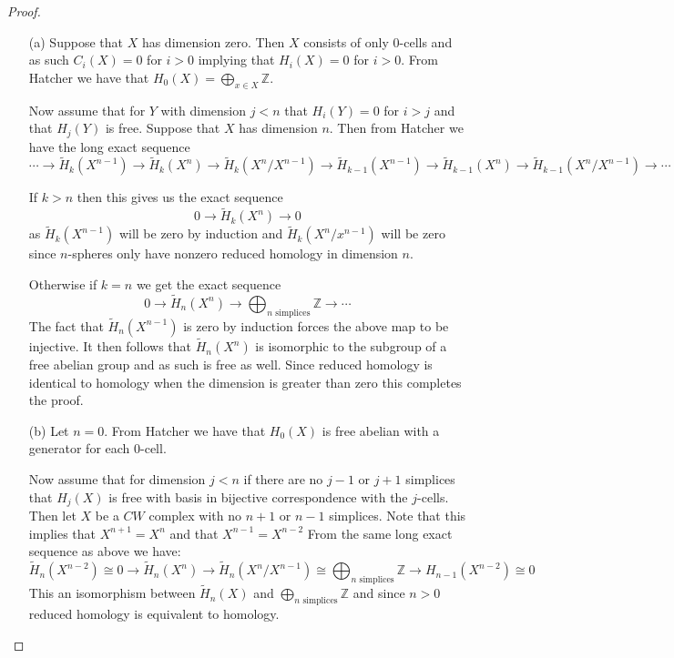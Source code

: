 \documentclass[10pt]{article}
\newcommand{\bb}[1]{\mathbb{#1}}
\newcommand{\wt}[1]{\widetilde{#1}}
\theoremstyle{plain}
\theoremstyle{remark}
\begin{document}
\begin{proof}
  \begin{enumerate}
  \item[(a)]
    Suppose that $X$ has dimension zero. Then $X$ consists of only $0$-cells
    and as such $C_i(X)=0$ for $i>0$ implying that $H_i(X)=0$ for $i>0$. From
    Hatcher we have that $H_0(X)=\bigoplus_{x\in X}\bb{Z}$.

    Now assume that for $Y$ with dimension $j<n$ that $H_i(Y)=0$ for $i>j$ and
    that $H_j(Y)$ is free. Suppose that $X$ has dimension $n$. Then from Hatcher
    we have the long exact sequence
    \[
      \cdots \rightarrow \wt{H}_k(X^{n-1})\rightarrow \wt{H}_k(X^n) \rightarrow \wt{H}_k(X^n/X^{n-1}) \rightarrow \wt{H}_{k-1}(X^{n-1}) \rightarrow \wt{H}_{k-1}(X^n) \rightarrow \wt{H}_{k-1}(X^n/X^{n-1}) \rightarrow \cdots
    \]

    If $k>n$ then this gives us the exact sequence
    \[
      0\rightarrow \wt{H}_k(X^n)\rightarrow 0
    \]
    as $\wt{H}_k(X^{n-1})$ will be zero by induction and $\wt{H}_k(X^n/x^{n-1})$ will
    be zero since $n$-spheres only have nonzero reduced homology in dimension $n$.

    Otherwise if $k=n$ we get the exact sequence
    \[
      0\rightarrow \wt{H}_n(X^n)\rightarrow \bigoplus_{n\text{ simplices}}\bb{Z}\rightarrow\cdots
    \]
    The fact that $\wt{H}_n(X^{n-1})$ is zero by induction forces the above map
    to be injective. It then follows that $\wt{H}_n(X^n)$ is isomorphic to the
    subgroup of a free abelian group and as such is free as well. Since reduced
    homology is identical to homology when the dimension is greater than zero
    this completes the proof.
    
  \item[(b)]
    Let $n=0$. From Hatcher we have that $H_0(X)$ is free abelian
    with a generator for each 0-cell.

    Now assume that for dimension $j<n$ if there are no $j-1$ or $j+1$ simplices
    that $H_j(X)$ is free with basis in bijective correspondence with the $j$-cells.
    Then let $X$ be a $CW$ complex with no $n+1$ or $n-1$ simplices. Note that this
    implies that $X^{n+1}=X^n$ and  that $X^{n-1}=X^{n-2}$ From the
    same long exact sequence as above we have:
    \[
      \wt{H}_n(X^{n-2})\cong 0\rightarrow \wt{H}_n(X^n)\rightarrow\wt{H}_n(X^n/X^{n-1})\cong\bigoplus_{n\text{ simplices}}\bb{Z} \rightarrow H_{n-1}(X^{n-2})\cong 0
    \]
    This an isomorphism between $\wt{H}_n(X)$ and $\bigoplus_{n\text{ simplices}}\bb{Z}$ and since
    $n>0$ reduced homology is equivalent to homology.


\end{enumerate}
\end{proof}
\end{document}
